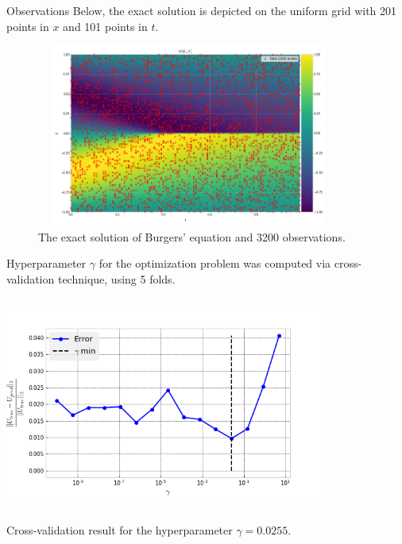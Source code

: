 \documentclass{beamer}
\begin{document}
\begin{frame}{Observations}
\small
Below, the exact solution is depicted on the uniform grid with 201 points in $x$ and 101 points in $t$. 
\begin{figure}
    \centering
    \includegraphics[width=10cm, height=6cm]{images/burgers-exact.png}
    \caption{The exact solution of Burgers' equation and 3200 observations.}
    \label{fig:my_label}
\end{figure}

\end{frame}

\begin{frame}
Hyperparameter $\gamma$ for the optimization problem was computed via cross-validation technique, using 5 folds. 

\centering
\includegraphics[width=10.5cm, height=7cm]{images/burgers-cross_val_gamma.png}

Cross-validation result for the hyperparameter $\gamma = 0.0255$.
\end{frame}
\end{document}
